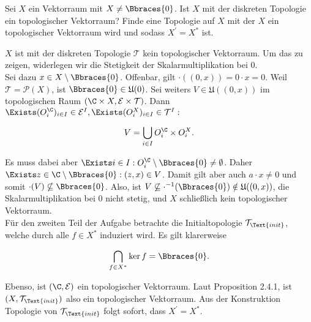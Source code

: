 \begin{exercise}

Sei $X$ ein Vektorraum mit $X \neq \Bbraces{0}$.
Ist $X$ mit der diskreten Topologie ein topologischer Vektorraum?
Finde eine Topologie auf $X$ mit der $X$ ein topologischer Vektorraum wird und sodass $X^\prime = X^\ast$ ist.

\end{exercise}

\begin{solution}

$X$ ist mit der diskreten Topologie $\mathcal{T}$ kein topologischer Vektorraum.
Um das zu zeigen, widerlegen wir die Stetigkeit der Skalarmultiplikation bei $0$. \\


Sei dazu $x \in X \setminus \Bbraces{0}$.
Offenbar, gilt $\cdot((0, x)) = 0 \cdot x = 0$.
Weil $\mathcal{T} = \mathcal{P}(X)$, ist $\Bbraces{0} \in \mathfrak{U}(0)$.
Sei weiters $V \in \mathfrak{U}((0, x))$ im topologischen Raum $(\C \times X, \mathcal{E} \times \mathcal{T})$.
Dann $\Exists (O_i^\C)_{i \in I} \in \mathcal{E}^I, \Exists (O_i^X)_{i \in I} \in \mathcal{T}^I:$

\begin{align*}
  V = \bigcup_{i \in I} O_i^\C \times O_i^X.
\end{align*}

Es muss dabei aber $\Exists i \in I: O_i^\C \setminus \Bbraces{0} \neq \emptyset$.
Daher $\Exists z \in \C \setminus \Bbraces{0}: (z, x) \in V$.
Damit gilt aber auch $a \cdot x \neq 0$ und somit $\cdot(V) \nsubseteq \Bbraces{0}$.
Also, ist $V \not \subseteq \cdot^{-1}(\Bbraces{0}) \notin \mathfrak{U}((0, x))$, die Skalarmultiplikation bei $0$ nicht stetig, und $X$ schließlich kein topologischer Vektorraum. \\

Für den zweiten Teil der Aufgabe betrachte die Initialtopologie $\mathcal{T}_\Text{init}$, welche durch alle $f \in X^\ast$ induziert wird.
Es gilt klarerweise

\begin{align*}
  \bigcap_{f \in X^\ast} \ker f = \Bbraces{0}.
\end{align*}

Ebenso, ist $(\C, \mathcal{E})$ ein topologischer Vektorraum.
Laut Proposition 2.4.1, ist $(X, \mathcal{T}_\Text{init})$ also ein topologischer Vektorraum.
Aus der Konstruktion Topologie von $\mathcal{T}_\Text{init}$ folgt sofort, dass $X^\prime = X^\ast$.

\end{solution}

